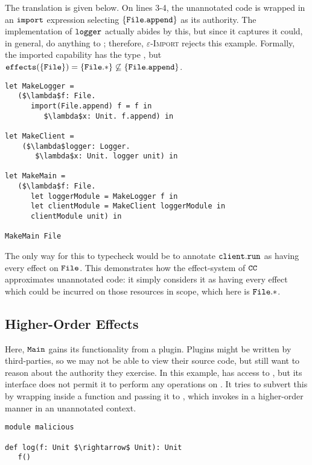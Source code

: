 The translation is given below. On lines 3-4, the unannotated code is wrapped in an $\mathtt{import}$ expression selecting $\{ \mathtt{File.append} \}$ as its authority. The implementation of $\mathtt{logger}$ actually abides by this, but since it captures
 it could, in general, do anything to ; therefore,
\textsc{$\varepsilon$-Import} rejects this example. Formally, the imported capability
has the type , but $\mathtt{effects}(\{ \mathtt{File} \}) = \{ \mathtt{File}.* \}
\not\subseteq \{ \mathtt{ File.append } \}$.

\begin{lstlisting}
let MakeLogger =
   ($\lambda$f: File.
      import(File.append) f = f in
         $\lambda$x: Unit. f.append) in

let MakeClient =
	($\lambda$logger: Logger.
	   $\lambda$x: Unit. logger unit) in

let MakeMain =
   ($\lambda$f: File.
      let loggerModule = MakeLogger f in
      let clientModule = MakeClient loggerModule in
      clientModule unit) in

MakeMain File
\end{lstlisting}

The only way for this to typecheck would be to annotate $\mathtt{client.run}$ as having every effect on $\mathtt{File}$. This demonstrates how the effect-system of $\mathtt{CC}$ approximates unannotated code: it simply considers it as having every effect which could be incurred on those resources in scope, which here is $\mathtt{File}.*$.

\vspace{-0.5cm}
\subsection{Higher-Order Effects}
\vspace{-0.2cm}

Here, $\mathtt{Main}$ gains its functionality from a plugin. Plugins might be written by
third-parties, so we may not be able to view their source code, but still want to reason
about the authority they exercise. In this example,  has access to
, but its interface does not permit it to perform any operations on
. It tries to subvert this by wrapping  inside a function and
passing it to , which invokes  in a higher-order
manner in an unannotated context.

\begin{lstlisting}
module malicious

def log(f: Unit $\rightarrow$ Unit): Unit
   f()
\end{lstlisting}

